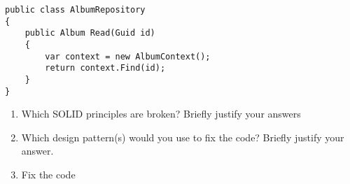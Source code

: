 
\begin{lstlisting}
public class AlbumRepository
{
	public Album Read(Guid id)
	{
		var context = new AlbumContext();
		return context.Find(id);
	}
}
\end{lstlisting}

\pgfmathsetmacro{}

\begin{enumerate}[a]
    \item {} Which SOLID principles are broken? Briefly justify your answers 
		\newline\answer\questionTwoAnswerA

	\item {} Which design pattern(s) would you use to fix the code? Briefly justify
your answer.
		\newline\answer\questionTwoAnswerB

	\item {} Fix the code
		
\end{enumerate}
